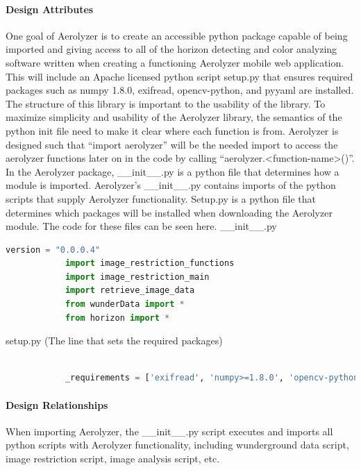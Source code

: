 \documentclass[onecolumn, draftclsnofoot,10pt, compsoc]{IEEEtran}
\begin{document}
\begin{singlespace}
          \paragraph{Design Attributes}
                    One goal of Aerolyzer is to create an accessible python package capable of being imported and giving access to all of the horizon detecting and color analyzing software written when creating a functioning Aerolyzer mobile web application. This will include an Apache licensed python script setup.py that ensures required packages such as numpy 1.8.0, exifread, opencv-python, and pyyaml are installed. 
      The structure of this library is important to the usability of the library. To maximize simplicity and usability of the Aerolyzer library, the semantics of the python init file need to make it clear where each function is from. Aerolyzer is designed such that “import aerolyzer” will be the needed import to access the aerolyzer functions later on in the code by calling “aerolyzer.<function-name>()”.
			In the Aerolyzer package, \_\_init\_\_.py is a python file that determines how a module is imported. Aerolyzer’s \_\_init\_\_.py contains imports of the python scripts that supply Aerolyzer functionality. Setup.py is a python file that determines which packages will be installed when downloading the Aerolyzer module. The code for these files can be seen here.
            \_\_init\_\_.py
            \begin{lstlisting}[language=Python]
            version = "0.0.0.4"
            import image_restriction_functions
            import image_restriction_main
            import retrieve_image_data
            from wunderData import *
            from horizon import *
			\end{lstlisting}
            setup.py (The line that sets the required packages)
            \begin{lstlisting}[language=Python]

            _requirements = ['exifread', 'numpy>=1.8.0', 'opencv-python', 'pyyaml',]

            \end{lstlisting}
          \paragraph{Design Relationships}
          When importing Aerolyzer, the \_\_init\_\_.py script executes and imports all python scripts with Aerolyzer functionality, including wunderground data script, image restriction script, image analysis script, etc.

\end{singlespace}
\end{document}
